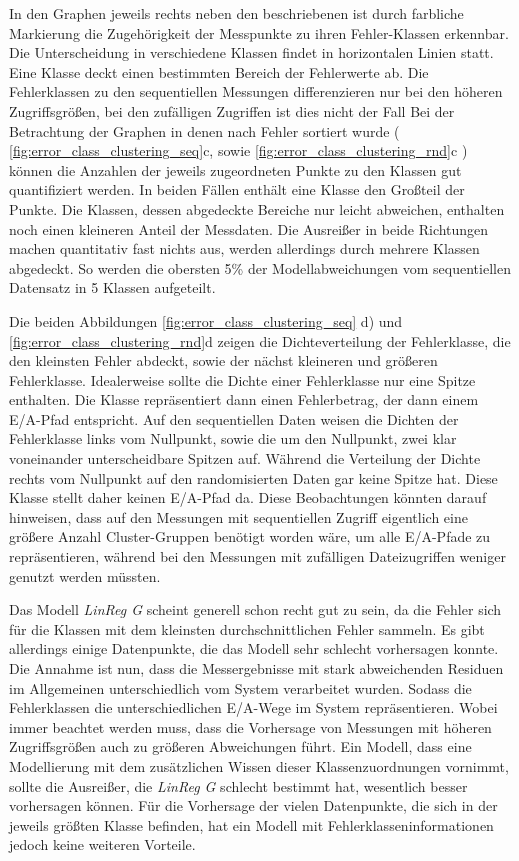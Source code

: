 \documentclass[
	12pt,
	a4paper,
	BCOR10mm,
	DIV14,
	listof=totoc,
	bibliography=totoc,
	headsepline
]{scrreprt}
\begin{document}
In den Graphen jeweils rechts neben den beschriebenen ist durch farbliche Markierung die Zugehörigkeit der Messpunkte zu ihren Fehler-Klassen erkennbar.
Die Unterscheidung in verschiedene Klassen findet in horizontalen Linien statt. Eine Klasse deckt einen bestimmten Bereich der Fehlerwerte ab.
Die Fehlerklassen zu den sequentiellen Messungen differenzieren nur bei den höheren Zugriffsgrößen, bei den zufälligen Zugriffen ist dies nicht der Fall
Bei der Betrachtung der Graphen in denen nach Fehler sortiert wurde ( \ref{fig:error_class_clustering_seq}c, sowie \ref{fig:error_class_clustering_rnd}c ) können die Anzahlen der jeweils zugeordneten Punkte zu den Klassen gut quantifiziert werden.
In beiden Fällen enthält eine Klasse den Großteil der Punkte. Die Klassen, dessen abgedeckte Bereiche nur leicht abweichen, enthalten noch einen kleineren Anteil der Messdaten.
Die Ausreißer in beide Richtungen machen quantitativ fast nichts aus, werden allerdings durch mehrere Klassen abgedeckt. So werden die obersten 5\% der Modellabweichungen vom sequentiellen Datensatz in 5 Klassen aufgeteilt.

Die beiden Abbildungen \ref{fig:error_class_clustering_seq} d) und \ref{fig:error_class_clustering_rnd}d zeigen die Dichteverteilung der Fehlerklasse, die den kleinsten Fehler abdeckt, sowie der nächst kleineren und größeren Fehlerklasse.
Idealerweise sollte die Dichte einer Fehlerklasse nur eine Spitze enthalten. Die Klasse repräsentiert dann einen Fehlerbetrag, der dann einem E/A-Pfad entspricht.
Auf den sequentiellen Daten weisen die Dichten der Fehlerklasse links vom Nullpunkt, sowie die um den Nullpunkt, zwei klar voneinander unterscheidbare Spitzen auf.
Während die Verteilung der Dichte rechts vom Nullpunkt auf den randomisierten Daten gar keine Spitze hat. Diese Klasse stellt daher keinen E/A-Pfad da.
Diese Beobachtungen könnten darauf hinweisen, dass auf den Messungen mit sequentiellen Zugriff eigentlich eine größere Anzahl Cluster-Gruppen benötigt worden wäre, um alle E/A-Pfade zu repräsentieren, während bei den Messungen mit zufälligen Dateizugriffen weniger genutzt werden müssten. 

Das Modell \textit{LinReg G} scheint generell schon recht gut zu sein, da die Fehler sich für die Klassen mit dem kleinsten durchschnittlichen Fehler sammeln.
Es gibt allerdings einige Datenpunkte, die das Modell sehr schlecht vorhersagen konnte. Die Annahme ist nun, dass die Messergebnisse mit stark abweichenden Residuen im Allgemeinen unterschiedlich vom System verarbeitet wurden. 
Sodass die Fehlerklassen die unterschiedlichen E/A-Wege im System repräsentieren. 
Wobei immer beachtet werden muss, dass die Vorhersage von Messungen mit höheren Zugriffsgrößen auch zu größeren Abweichungen führt.
Ein Modell, dass eine Modellierung mit dem zusätzlichen Wissen dieser Klassenzuordnungen vornimmt, sollte die Ausreißer, die \textit{LinReg G} schlecht bestimmt hat, wesentlich besser vorhersagen können.
Für die Vorhersage der vielen Datenpunkte, die sich in der jeweils größten Klasse befinden, hat ein Modell mit Fehlerklasseninformationen jedoch keine weiteren Vorteile. 
\end{document}
